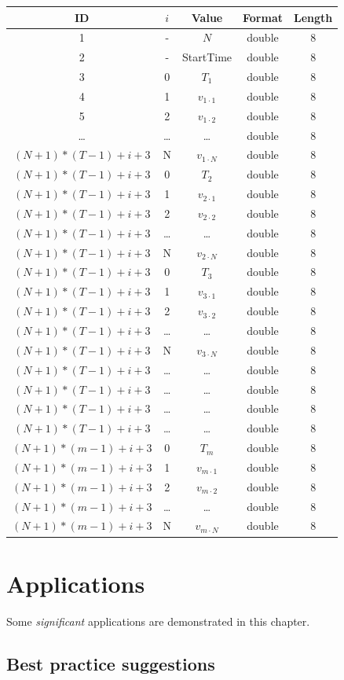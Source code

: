 \documentclass[]{scrbook}
\begin{document}
\begin{longtable}[]{@{}ccccc@{}}
\toprule
ID & \(i\) & Value & Format & Length\tabularnewline
\midrule
\endhead
1 & - & \(N\) & double & 8\tabularnewline
2 & - & StartTime & double & 8\tabularnewline
3 & 0 & \(T_1\) & double & 8\tabularnewline
4 & 1 & \(v_{1 \cdot 1}\) & double & 8\tabularnewline
5 & 2 & \(v_{1 \cdot 2}\) & double & 8\tabularnewline
\ldots{} & \ldots{} & \ldots{} & double & 8\tabularnewline
\((N+1) * (T-1) + i +3\) & N & \(v_{1 \cdot N}\) & double &
8\tabularnewline
\((N+1) * (T-1) + i +3\) & 0 & \(T_2\) & double & 8\tabularnewline
\((N+1) * (T-1) + i +3\) & 1 & \(v_{2 \cdot 1}\) & double &
8\tabularnewline
\((N+1) * (T-1) + i +3\) & 2 & \(v_{2 \cdot 2}\) & double &
8\tabularnewline
\((N+1) * (T-1) + i +3\) & \ldots{} & \ldots{} & double &
8\tabularnewline
\((N+1) * (T-1) + i +3\) & N & \(v_{2 \cdot N}\) & double &
8\tabularnewline
\((N+1) * (T-1) + i +3\) & 0 & \(T_3\) & double & 8\tabularnewline
\((N+1) * (T-1) + i +3\) & 1 & \(v_{3 \cdot 1}\) & double &
8\tabularnewline
\((N+1) * (T-1) + i +3\) & 2 & \(v_{3 \cdot 2}\) & double &
8\tabularnewline
\((N+1) * (T-1) + i +3\) & \ldots{} & \ldots{} & double &
8\tabularnewline
\((N+1) * (T-1) + i +3\) & N & \(v_{3 \cdot N}\) & double &
8\tabularnewline
\((N+1) * (T-1) + i +3\) & \ldots{} & \ldots{} & double &
8\tabularnewline
\((N+1) * (T-1) + i +3\) & \ldots{} & \ldots{} & double &
8\tabularnewline
\((N+1) * (T-1) + i +3\) & \ldots{} & \ldots{} & double &
8\tabularnewline
\((N+1) * (T-1) + i +3\) & \ldots{} & \ldots{} & double &
8\tabularnewline
\((N+1) * (m-1) + i +3\) & 0 & \(T_{m}\) & double & 8\tabularnewline
\((N+1) * (m-1) + i +3\) & 1 & \(v_{m \cdot 1}\) & double &
8\tabularnewline
\((N+1) * (m-1) + i +3\) & 2 & \(v_{m \cdot 2}\) & double &
8\tabularnewline
\((N+1) * (m-1) + i +3\) & \ldots{} & \ldots{} & double &
8\tabularnewline
\((N+1) * (m-1) + i +3\) & N & \(v_{m \cdot N}\) & double &
8\tabularnewline
\bottomrule
\end{longtable}

\chapter{Applications}\label{applications}

Some \emph{significant} applications are demonstrated in this chapter.

\section{Best practice suggestions}\label{best-practice-suggestions}
\end{document}
